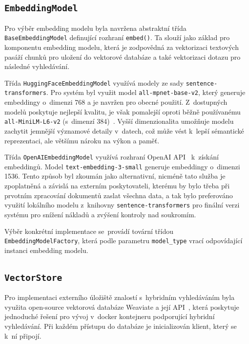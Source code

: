 \subsection{\texttt{EmbeddingModel}}
Pro výběr embedding modelu byla navržena abstraktní třída \texttt{BaseEmbeddingModel} definující rozhraní \texttt{embed()}. Ta slouží jako základ pro komponentu embedding modelu, která je zodpovědná za vektorizaci textových pasáží chunků pro uložení do vektorové databáze a také vektorizaci dotazu pro následné vyhledávání.

Třída \texttt{HuggingFaceEmbeddingModel} využívá modely ze sady \texttt{sentence-transformers}. Pro systém byl využit model \texttt{all-mpnet-base-v2}, který generuje embeddingy o~dimenzi 768 a je navržen pro obecné použití. Z~dostupných modelů poskytuje nejlepší kvalitu, je však pomalejší oproti běžně používanému \texttt{all-MiniLM-L6-v2} (s~dimenzí 384)~\cite{sentence-tranformers}. Vyšší dimenzionalita umožňuje modelu zachytit jemnější významové detaily v~datech, což může vést k~lepší sémantické reprezentaci, ale většímu nároku na výkon a paměť.

Třída \texttt{OpenAIEmbeddingModel} využívá rozhraní OpenAI API~\cite{openaiembed} k~získání embeddingů. Model \texttt{text-embedding-3-small} generuje embeddingy o~dimenzi 1536. Tento způsob byl zkoumán jako alternativní, nicméně tato služba je zpoplatněná a závislá na externím poskytovateli, kterému by bylo třeba při prvotním zpracování dokumentů zaslat všechna data, a tak bylo preferováno využití lokálního modelu z~knihovny \texttt{sentence-transformers} pro finální verzi systému pro snížení nákladů a zvýšení kontroly nad soukromím. 

Výběr konkrétní implementace se~provádí tovární třídou \texttt{EmbeddingModelFactory}, která podle parametru \texttt{model\_type} vrací odpovídající instanci embedding modelu.

\subsection{\texttt{VectorStore}}
\label{vectorstore}
Pro implementaci externího úložiště znalostí s~hybridním vyhledáváním byla využita open-source vektorová databáze Weaviate a její API~\cite{weaviate}, která poskytuje jednoduché řešení pro vývoj v~docker kontejneru podporující hybridní vyhledávání. Při každém přístupu do databáze je inicializován klient, který se k~ní připojí. 

